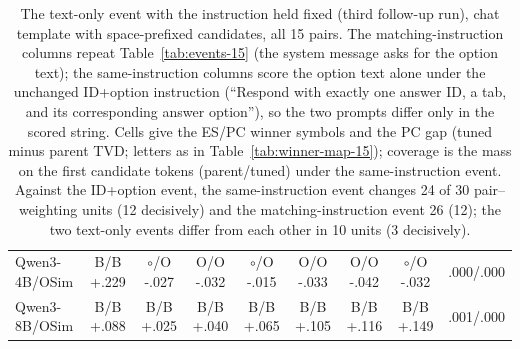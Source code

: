 \begin{table}[t]
\begin{tabular}{@{}lcccccccc@{}}
\addlinespace[2pt]
Qwen3-4B/OSim & B/B +.229 & $\circ$/O -.027 & O/O -.032 & $\circ$/O -.015 & O/O -.033 & O/O -.042 & $\circ$/O -.032 & .000/.000 \\
Qwen3-8B/OSim & B/B +.088 & B/B +.025 & B/B +.040 & B/B +.065 & B/B +.105 & B/B +.116 & B/B +.149 & .001/.000 \\
\bottomrule
\end{tabular}
\caption{The text-only event with the instruction held fixed (third follow-up run), chat template with space-prefixed candidates, all 15 pairs. The matching-instruction columns repeat Table~\ref{tab:events-15} (the system message asks for the option text); the same-instruction columns score the option text alone under the unchanged ID+option instruction (``Respond with exactly one answer ID, a tab, and its corresponding answer option''), so the two prompts differ only in the scored string. Cells give the ES/PC winner symbols and the PC gap (tuned minus parent TVD; letters as in Table~\ref{tab:winner-map-15}); coverage is the mass on the first candidate tokens (parent/tuned) under the same-instruction event. Against the ID+option event, the same-instruction event changes 24 of 30 pair--weighting units (12 decisively) and the matching-instruction event 26 (12); the two text-only events differ from each other in 10 units (3 decisively).}
\label{tab:events-same-instruction}
\end{table}
